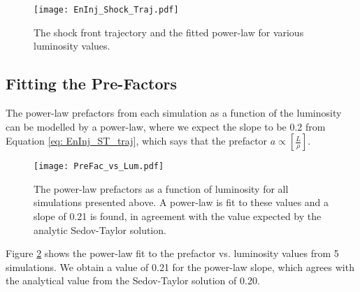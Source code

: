 \documentclass{article}
\begin{document}
\begin{figure}[h]
    \centering
    \texttt{[image: EnInj\_Shock\_Traj.pdf]}
    \caption{The shock front trajectory and the fitted power-law for various luminosity values.}
    \label{fig: EnInj_Shock_traj}
\end{figure}


\subsection{Fitting the Pre-Factors}
The power-law prefactors from each simulation as a function of the luminosity can be modelled by a power-law, where we expect the slope to be 0.2 from Equation \ref{eq: EnInj_ST_traj}, which says that the prefactor $a \propto \left[ \frac{L}{\rho} \right]$. 
\begin{figure}[h]
    \centering
    \texttt{[image: PreFac\_vs\_Lum.pdf]}
    \caption{The power-law prefactors as a function of luminosity for all simulations presented above. A power-law is fit to these values and a slope of 0.21 is found, in agreement with the value expected by the analytic Sedov-Taylor solution.}
    \label{fig: PreFac_vs_Lum}
\end{figure}
Figure \ref{fig: PreFac_vs_Lum} shows the power-law fit to the prefactor vs. luminosity values from 5 simulations. We obtain a value of 0.21 for the power-law slope, which agrees with the analytical value from the Sedov-Taylor solution of 0.20.
 
\end{document}
